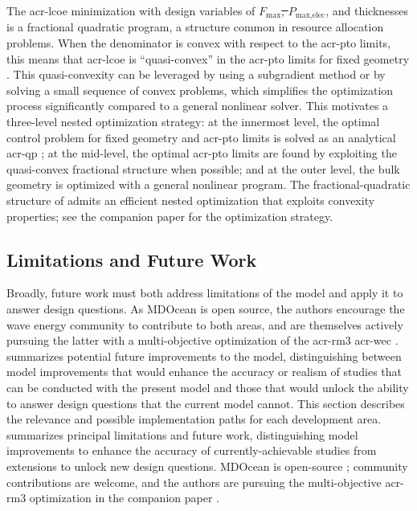 \documentclass[a4paper,fleqn,colorlinks,unicode,lineno]{cas-dc} %
\makeatletter
\providecommand{\DIFaddtex}[1]{{\protect\color{blue}\uwave{#1}}} %
\providecommand{\DIFdeltex}[1]{{\protect\color{red}\sout{#1}}} %
\providecommand{\DIFaddbegin}{} %
\providecommand{\DIFaddend}{} %
\providecommand{\DIFdelbegin}{} %
\providecommand{\DIFdelend}{} %
\providecommand{\DIFadd}[1]{\texorpdfstring{\DIFaddtex{#1}}{#1}} %
\providecommand{\DIFdel}[1]{\texorpdfstring{\DIFdeltex{#1}}{}} %
\providecommand{\DIFscaledelfig}{0.5}
\newlength{\DIFdelgraphicswidth} %
\newlength{\DIFdelgraphicsheight} %
\providecommand{\DIFaddincludegraphics}[2][]{{\color{blue}\fbox{\DIFOincludegraphics[#1]{#2}}}} %
\providecommand{\DIFdelincludegraphics}[2][]{%
\sbox{\DIFdelgraphicsbox}{\DIFOincludegraphics[#1]{#2}}%
\settoboxwidth{\DIFdelgraphicswidth}{\DIFdelgraphicsbox} %
\settoboxtotalheight{\DIFdelgraphicsheight}{\DIFdelgraphicsbox} %
\scalebox{\DIFscaledelfig}{%
\parbox[b]{\DIFdelgraphicswidth}{\usebox{\DIFdelgraphicsbox}\\[-\baselineskip] \rule{\DIFdelgraphicswidth}{0em}}\llap{\resizebox{\DIFdelgraphicswidth}{\DIFdelgraphicsheight}{%
\setlength{\unitlength}{\DIFdelgraphicswidth}%
\begin{picture}(1,1)%
\thicklines\linethickness{2pt} %
{\color[rgb]{1,0,0}\put(0,0){\framebox(1,1){}}}%
{\color[rgb]{1,0,0}\put(0,0){\line( 1,1){1}}}%
{\color[rgb]{1,0,0}\put(0,1){\line(1,-1){1}}}%
\end{picture}%
}\hspace*{3pt}}} %
} %
\DeclareRobustCommand{\DIFaddbegin}{\DIFOaddbegin \let\includegraphics\DIFaddincludegraphics} %
\DeclareRobustCommand{\DIFaddend}{\DIFOaddend \let\includegraphics\DIFOincludegraphics} %
\DeclareRobustCommand{\DIFdelbegin}{\DIFOdelbegin \let\includegraphics\DIFdelincludegraphics} %
\DeclareRobustCommand{\DIFdelend}{\DIFOaddend \let\includegraphics\DIFOincludegraphics} %
\let\sout@orig\sout %
\renewcommand{\sout}[1]{\ifmmode\text{\sout@orig{\ensuremath{#1}}}\else\sout@orig{#1}\fi} %
\makeatother
\begin{document}
\ifdefined\DISSERTATION
    The \gls{acr-lcoe} minimization with design variables of \DIFdelbegin \DIFdel{$F_{\text{max}}$, $P_{\text{max},\text{elec}}$}\DIFdelend \DIFaddbegin \DIFadd{$\gls{sym-F-max}$, $\gls{sym-P-max}$}\DIFaddend , and thicknesses is a fractional quadratic program, a structure common in resource allocation problems.
    When the denominator is convex with respect to the \gls{acr-pto} limits, this means that \gls{acr-lcoe} is ``quasi-convex'' in the \gls{acr-pto} limits for fixed geometry \citep{agrawal_disciplined_2020}.
    This quasi-convexity can be leveraged by using a subgradient method or by solving a small sequence of convex problems, which simplifies the optimization process significantly compared to a general nonlinear solver.
    This motivates a three-level nested optimization strategy:
    at the innermost level, the optimal control problem for fixed geometry and \gls{acr-pto} limits is solved as an analytical \gls{acr-qp} ;
    at the mid-level, the optimal \gls{acr-pto} limits are found by exploiting the quasi-convex fractional structure when possible;
    and at the outer level, the bulk geometry is optimized with a general nonlinear program.
\else
    The fractional-quadratic structure of  admits an efficient nested optimization that exploits convexity properties; see the companion paper \citep{mccabe_leveraging_2026} for the optimization strategy.
\fi

\subsection{Limitations and Future Work}\label{sec:unmodeled-effects}
\ifdefined\DISSERTATION
    Broadly, future work must both address limitations of the model and apply it to answer design questions.
    As MDOcean is open source, the authors encourage the wave energy community to contribute to both areas, and are themselves actively pursuing the latter with a multi-objective optimization of the \gls{acr-rm3} \gls{acr-wec} \citep{mccabe_leveraging_2026}.
     summarizes potential future improvements to the model, distinguishing between model improvements that would enhance the accuracy or realism of studies that can be conducted with the present model and those that would unlock the ability to answer design questions that the current model cannot.
    This section describes the relevance and possible implementation paths for each development area.
\else
     summarizes principal limitations and future work, distinguishing model improvements to enhance the accuracy of currently-achievable studies from extensions to unlock new design questions.
    MDOcean is open-source \citep{mccabe_mdocean_2024}; community contributions are welcome, and the authors are pursuing the multi-objective \gls{acr-rm3} optimization in the companion paper \citep{mccabe_leveraging_2026}.
\fi
\end{document}
